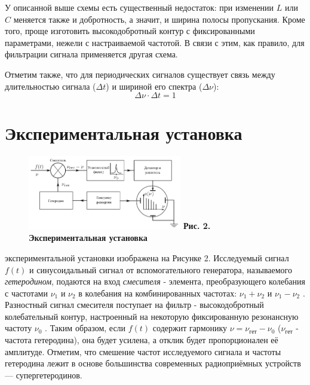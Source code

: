 \documentclass[15pt,a5paper,reqno]{article}
\begin{document}
    У описанной выше схемы есть существенный недостаток: при изменении $L$ или $C$ меняется также и добротность, а значит, и ширина полосы пропускания. Кроме того, проще изготовить высокодобротный контур с фиксированными параметрами, нежели с настраиваемой частотой.
    В связи с этим, как правило, для фильтрации сигнала применяется другая схема.

    Отметим также, что для периодических сигналов существует связь между длительностью сигнала ($\Delta t$) и шириной его спектра ($\Delta\nu$):
    \begin{equation}\label{uncertainty}
        \Delta\nu \cdot \Delta t = 1
    \end{equation}
    
\newpage
\section{Экспериментальная установка}

    \hypertarget{pic_2}{\begin{figure}
        \includegraphics[width=0.6\textwidth]{images/picture_2.png}
        \textbf{Рис. 2. Экспериментальная установка}
    \end{figure}}
     экспериментальной установки изображена на Рисунке 2. Исследуемый сигнал $f(t)$ и синусоидальный сигнал от вспомогательного генератора, называемого \textit{гетеродином}, подаются на вход \textit{смесителя} - элемента, преобразующего колебания с частотами $\nu_1$ и $\nu_2$ в колебания на комбинированных частотах: $\nu_1 + \nu_2$ и $\nu_1 - \nu_2$ . Разностный сигнал смесителя поступает на фильтр - высокодобротный колебательный контур, настроенный на некоторую фиксированную резонансную частоту $\nu_0$ . Таким образом, если $f(t)$ содержит гармонику $\nu = \nu_{\text{гет}} - \nu_0$ ($\nu_{\text{гет}}$ - частота гетеродина), она будет усилена, а отклик будет пропорционален её амплитуде. Отметим, что смешение частот исследуемого сигнала и частоты гетеродина лежит в основе большинства современных радиоприёмных устройств — супергетеродинов.
\end{document}
